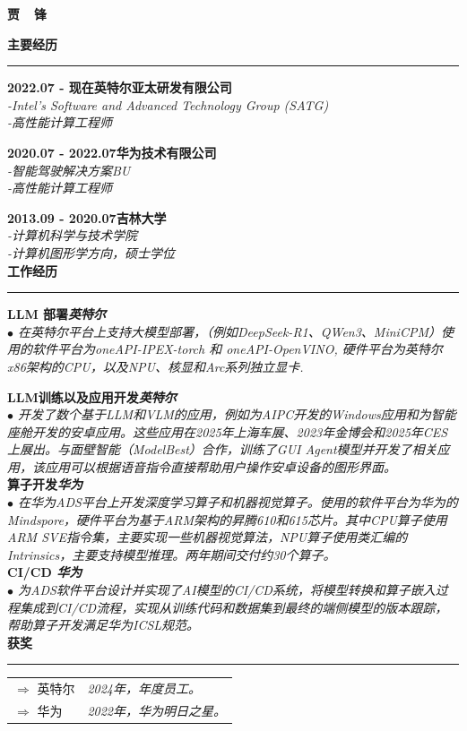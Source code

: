 \documentclass[a4paper,12pt,final]{memoir}
\newcommand{\myThemeColor}{RoyalBlue}
\newcommand{\SmallSep}{\vspace{0.9em}}
\newcommand{\CVSection}[1]
	{\Large\textbf{#1}\par
	\vspace{0.2cm}\normalsize\normalfont}
\newcommand{\CVItem}[1]
	{\textbf{\color{\myThemeColor} #1}}
\begin{document}
\Huge\bfseries {\color{\myThemeColor} 贾~~锋}\\
\normalsize\normalfont

\CVSection{主要经历}
\hrule
\SmallSep

\CVItem{2022.07 - 现在\hfill\textsc{英特尔亚太研发有限公司}}\\
\textit{-Intel's Software and Advanced Technology Group (SATG)}\\
\textit{-高性能计算工程师}

\CVItem{2020.07 - 2022.07\hfill\textsc{华为技术有限公司}}\\
\textit{-智能驾驶解决方案BU}\\
\textit{-高性能计算工程师}

\CVItem{2013.09 - 2020.07\hfill\textsc{吉林大学}}\\
\textit{-计算机科学与技术学院}\\
\textit{-计算机图形学方向，硕士学位}
\\

\CVSection{工作经历}
\hrule
\SmallSep
\CVItem{LLM 部署\hfill\emph{英特尔}}\\
\textit{$\bullet$ 在英特尔平台上支持大模型部署，（例如DeepSeek-R1、QWen3、MiniCPM）使用的软件平台为oneAPI-IPEX-torch 和 oneAPI-OpenVINO, 硬件平台为英特尔x86架构的CPU，以及NPU、核显和Arc系列独立显卡. }

\CVItem{LLM训练以及应用开发\hfill\emph{英特尔}}\\
\textit{$\bullet$ 
开发了数个基于LLM和VLM的应用，例如为AIPC开发的Windows应用和为智能座舱开发的安卓应用。这些应用在2025年上海车展、2023年金博会和2025年CES上展出。与面壁智能（ModelBest）合作，训练了GUI Agent模型并开发了相关应用，该应用可以根据语音指令直接帮助用户操作安卓设备的图形界面。} 
\\
\CVItem{算子开发\hfill\emph{华为}}\\
\textit{$\bullet$ 
在华为ADS平台上开发深度学习算子和机器视觉算子。使用的软件平台为华为的Mindspore，硬件平台为基于ARM架构的昇腾610和615芯片。其中CPU算子使用ARM SVE指令集，主要实现一些机器视觉算法，NPU算子使用类汇编的Intrinsics，主要支持模型推理。两年期间交付约30个算子。}
\\
\CVItem{CI/CD \hfill\emph{华为}}\\
\textit{$\bullet$ 
为ADS软件平台设计并实现了AI模型的CI/CD系统，将模型转换和算子嵌入过程集成到CI/CD流程，实现从训练代码和数据集到最终的端侧模型的版本跟踪，帮助算子开发满足华为ICSL规范。}
\\

\CVSection{获奖}
\hrule
\SmallSep
	\begin{tabular}{l|l}
		$\Rightarrow$ 英特尔&\textit{ 2024年，年度员工。}\footnotesize\\
		$\Rightarrow$ 华为&\textit{ 2022年，华为明日之星。}\\
	\end{tabular}

\end{document}
